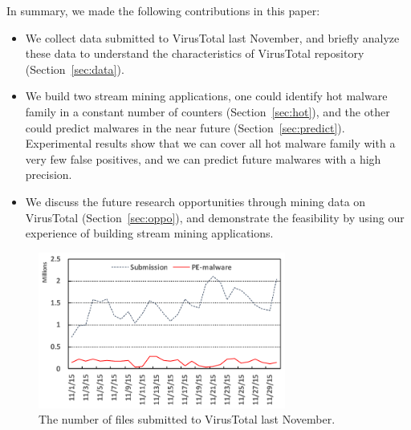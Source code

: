 In summary, we made the following contributions in this paper:

\begin{itemize}

\item We collect data submitted to VirusTotal last November, 
and briefly analyze these data to understand the characteristics of VirusTotal repository (Section~\ref{sec:data}). 
\item We build two stream mining applications, one could identify hot malware family in a constant number of counters (Section~\ref{sec:hot}), 
and the other could predict malwares in the near future (Section~\ref{sec:predict}). 
Experimental results show that we can cover all hot malware family with a very few false positives, and we can predict future malwares with a high precision.
\item We discuss the future research opportunities through mining data on VirusTotal (Section~\ref{sec:oppo}), 
and demonstrate the feasibility by using our experience of building stream mining applications. 

\end{itemize}


\begin{figure}[t!]
\begin{center}
\includegraphics[width=3.2in]{figure/nov}
\caption{The number of files submitted to VirusTotal last November. }
\label{fig:subnum}
\end{center}
\end{figure}
